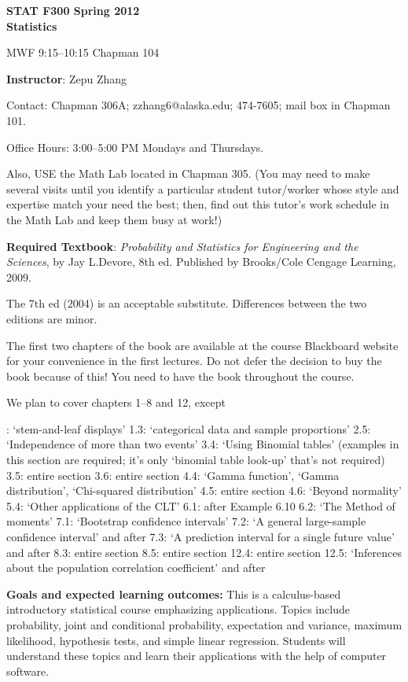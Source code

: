 \documentclass{article}
\begin{document}
\textbf{\large STAT F300 \hfill Spring 2012\\
Statistics}

MWF 9:15--10:15 Chapman 104

\bigskip
\textbf{\large Instructor}: Zepu Zhang

Contact: Chapman 306A; zzhang6@alaska.edu;
    474-7605; mail box in Chapman 101.

Office Hours: 3:00--5:00 PM Mondays and Thursdays.

Also, USE the Math Lab located in Chapman 305.
(You may need to make several visits until you identify
a particular student tutor/worker whose style and expertise match your
need the best; then, find out this tutor's work schedule in the Math Lab
and keep them busy at work!)


\bigskip
\textbf{\large Required Textbook}:
\textit{Probability and Statistics for Engineering and the Sciences},
by Jay L.\@ Devore, 8th ed. Published by Brooks/Cole Cengage Learning, 2009.

The 7th ed (2004) is an acceptable substitute.
Differences between the two editions are minor.

The first two chapters of the book
are available at the course Blackboard website
for your convenience in the first lectures.
Do not defer the decision to buy the book because of this!
You need to have the book throughout the course.

We plan to cover chapters 1--8 and 12, except

{: `stem-and-leaf displays'
1.3: `categorical data and sample proportions'
2.5: `Independence of more than two events'
3.4: `Using Binomial tables' (examples in this section are required; it's only `binomial table look-up' that's not required)
3.5: entire section
3.6: entire section
4.4: `Gamma function', `Gamma distribution', `Chi-squared distribution'
4.5: entire section
4.6: `Beyond normality'
5.4: `Other applications of the CLT'
6.1: after Example 6.10
6.2: `The Method of moments'
7.1: `Bootstrap confidence intervals'
7.2: `A general large-sample confidence interval' and after
7.3: `A prediction interval for a single future value' and after
8.3: entire section
8.5: entire section
12.4: entire section
12.5: `Inferences about the population correlation coefficient' and after
}


\bigskip
\textbf{\large Goals and expected learning outcomes:}
This is a calculus-based introductory statistical course emphasizing
applications. Topics include probability, joint and conditional
probability, expectation and variance, maximum likelihood,
hypothesis tests, and simple linear regression.
Students will understand these topics and learn their applications with
the help of computer software.
\end{document}
